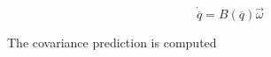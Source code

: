 \documentclass{article}
\begin{document}
\begin{flushleft}
\[ \dot{\overline{q}} = B(\overline{q}) \vec{\omega} \]

The covariance prediction is computed 






\end{flushleft}
\end{document}
